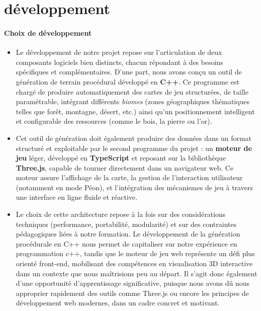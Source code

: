 \section{développement}


\paragraph{Choix de développement}

\begin{itemize}
    \item Le développement de notre projet repose sur l’articulation de deux composants logiciels bien distincts, chacun répondant à des besoins spécifiques et complémentaires. D’une part, nous avons conçu un outil de génération de terrain procédural développé en \textbf{C++}. Ce programme est chargé de produire automatiquement des cartes de jeu structurées, de taille paramétrable, intégrant différents \textit{biomes} (zones géographiques thématiques telles que forêt, montagne, désert, etc.) ainsi qu’un positionnement intelligent et configurable des ressources (comme le bois, la pierre ou l’or).
    \\
    \item Cet outil de génération doit également produire des données dans un format structuré et exploitable par le second programme du projet : un \textbf{moteur de jeu} léger, développé en \textbf{TypeScript} et reposant sur la bibliothèque \textbf{Three.js}, capable de tourner directement dans un navigateur web. Ce moteur assure l’affichage de la carte, la gestion de l’interaction utilisateur (notamment en mode Péon), et l'intégration des mécanismes de jeu à travers une interface en ligne fluide et réactive.
    \\
    \item Le choix de cette architecture repose à la fois sur des considérations techniques (performance, portabilité, modularité) et sur des contraintes pédagogiques liées à notre formation. Le développement de la génération procédurale en C++ nous permet de capitaliser sur notre expérience en programmation c++, tandis que le moteur de jeu web représente un défi plus orienté front-end, mobilisant des compétences en visualisation 3D interactive dans un contexte que nous maîtrisions peu au départ. Il s'agit donc également d'une opportunité d’apprentissage significative, puisque nous avons dû nous approprier rapidement des outils comme Three.js ou encore les principes de développement web modernes, dans un cadre concret et motivant.
    \\

\end{itemize}

